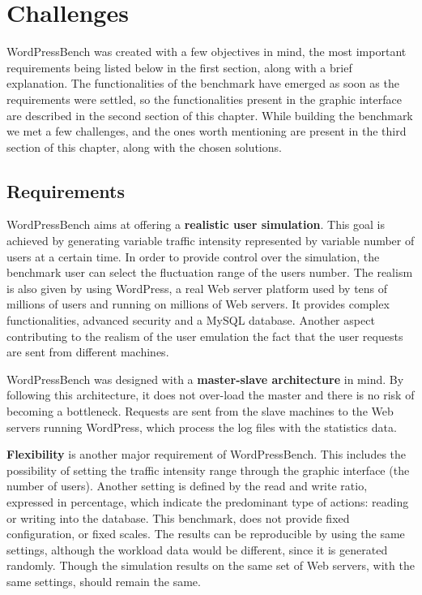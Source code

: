 \chapter{Challenges}
\label{chapter:chapter3}

WordPressBench was created with a few objectives in mind, the most important requirements being listed below in the first section, along with a brief explanation. The functionalities of the benchmark have emerged as soon as the requirements were settled, so the functionalities present in the graphic interface are described in the second section of this chapter. While building the benchmark we met a few challenges, and  the ones worth mentioning are present in the third section of this chapter, along with the chosen solutions.

\section{Requirements}
\label{sec:projectdescription}

WordPressBench aims at offering a \textbf{realistic user simulation}. This goal is achieved by generating variable traffic intensity represented by variable number of users at a certain time. In order to provide control over the simulation, the benchmark user can select the fluctuation range of the users number. The realism is also given by using WordPress, a real Web server platform used by tens of millions of users and running on millions of Web servers. It provides complex functionalities, advanced security and a MySQL database. Another aspect contributing to the realism of the user emulation the fact that the user requests are sent from different machines.

WordPressBench was designed with a \textbf{master-slave architecture} in mind. By following this architecture, it does not over-load the master and there is no risk of becoming a bottleneck. Requests are sent from the slave machines to the Web servers running WordPress, which process the log files with the statistics data.

\textbf{Flexibility} is another major requirement of WordPressBench. This includes the possibility of setting the traffic intensity range through the graphic interface (the number of users). Another setting is defined by the read and write ratio, expressed in percentage, which indicate the predominant type of actions: reading or writing into the database. This benchmark, does not provide fixed configuration, or fixed scales. The results can be reproducible by using the same settings, although the workload data would be different, since it is generated randomly. Though the simulation results on the same set of Web servers, with the same settings, should remain the same.

